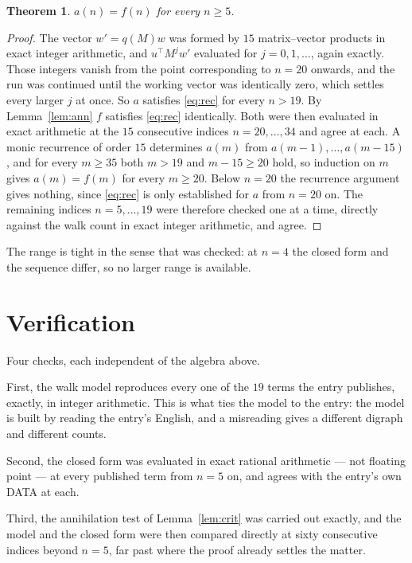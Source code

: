 \documentclass[11pt,a4paper]{article}
\theoremstyle{plain}
\newtheorem{theorem}{Theorem}
\theoremstyle{definition}
\begin{document}
\begin{theorem}
$a(n)=f(n)$ for every $n\ge5$.
\end{theorem}

\begin{proof}
The vector $w'=q(M)w$ was formed by $15$ matrix--vector products in exact integer
arithmetic, and $u^{\!\top}M^{j}w'$ evaluated for $j=0,1,\dots$, again exactly. Those integers
vanish from the point corresponding to $n=20$ onwards, and the run was continued until the
working vector was identically zero, which settles every larger $j$ at once. So $a$ satisfies
\eqref{eq:rec} for every $n>19$. By Lemma~\ref{lem:ann} $f$ satisfies \eqref{eq:rec}
identically. Both were then evaluated in exact arithmetic at the $15$ consecutive indices
$n=20,\dots,34$ and agree at each. A monic recurrence of order $15$
determines $a(m)$ from $a(m-1),\dots,a(m-15)$, and for every $m\ge35$ both
$m>19$ and $m-15\ge20$ hold, so induction on $m$ gives $a(m)=f(m)$ for every
$m\ge20$.
Below $n=20$ the recurrence argument gives nothing, since \eqref{eq:rec} is only
established for $a$ from $n=20$ on. The remaining indices $n=5,\dots,19$ were
therefore checked one at a time, directly against the walk count in exact integer arithmetic,
and agree.
\end{proof}

The range is tight in the sense that was checked: at $n=4$ the closed form and the sequence differ, so no larger range is available.

\section{Verification}

Four checks, each independent of the algebra above.

First, the walk model reproduces every one of the $19$ terms the entry publishes,
exactly, in integer arithmetic. This is what ties the model to the entry: the model is built
by reading the entry's English, and a misreading gives a different digraph and different
counts.

Second, the closed form was evaluated in exact rational arithmetic --- not floating point ---
at every published term from $n=5$ on, and agrees with the entry's own DATA at each.

Third, the annihilation test of Lemma~\ref{lem:crit} was carried out exactly, and the model
and the closed form were then compared directly at sixty consecutive indices beyond
$n=5$, far past where the proof already settles the matter.
\end{document}
